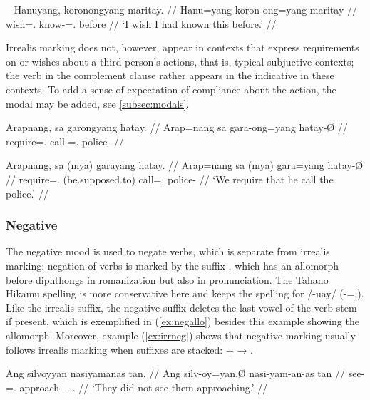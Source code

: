 \ex~\begingl
	\gla Hanuyang, koronongyang maritay. //
	\glb Hanu=yang koron-ong=yang maritay //
	\glc wish=\Fsg{}.\Aarg{} know-\Irr{}=\Fsg{}.\Aarg{} before //
	\glft `I wish I had known this before.' //
\endgl\xe

Irrealis marking does not, however, appear in contexts that express 
requirements on or wishes about a third person's actions, that is, typical 
subjuctive contexts; the verb in the complement clause rather appears in the 
indicative in these contexts. To add a sense of expectation of compliance about 
the action, the modal  may be added, see 
\autoref{subsec:modals}.

\pex
\a\ljudge*\begingl
	\gla Arapnang, sa garongyāng hatay. //
	\glb Arap=nang sa gara-ong=yāng hatay-Ø //
	\glc require=\Fpl{}.\Aarg{} \PatT{} call-\Irr{}=\TsgM{}.\Aarg{} 
		police-\Top{} //
\endgl

\a\label{ex:myashall}\begingl
	\gla Arapnang, sa (mya) garayāng hatay. //
	\glb Arap=nang sa (mya) gara=yāng hatay-Ø //
	\glc require=\Fpl{}.\Aarg{} \PatT{} (be.supposed.to) 
		call=\TsgM{}.\Aarg{} police-\Top{} //
	\glft `We require that he call the police.' //
\endgl
\xe


\subsubsection{Negative}

The negative mood is used to negate verbs, which is separate from irrealis 
marking: negation of verbs is marked by the suffix , which has 
an allomorph  before diphthongs in romanization but also in 
pronunciation. The Tahano Hikamu spelling is more conservative 
here and keeps the spelling  for /-uay/ 
(-\Neg{}=\Fsg{}.\Top{}). Like the irrealis suffix, the 
negative suffix deletes the last vowel of the verb stem if present, which is 
exemplified in (\ref{ex:negallo}) besides this example showing the  
allomorph. Moreover, example (\ref{ex:irrneg}) shows that negative marking 
usually follows irrealis marking when suffixes are stacked:  + 
 → .

\pex
\a\label{ex:negative}\begingl
	\gla Ang silvoyyan nasiyamanas tan. //
	\glb Ang silv-oy=yan.Ø nasi-yam-an-as tan //
	\glc \AgtT{} see-\Neg{}=\TplM{}.\Top{} approach-\Ptcp{}-\Nmlz{}-\Parg{} 
		\TplM{}.\Gen{} //
	\glft `They did not see them approaching.' //
\endgl

